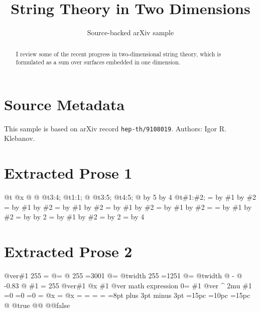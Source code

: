 \documentclass[11pt]{article}
\title{String Theory in Two Dimensions}
\author{Source-backed arXiv sample}
\date{}
\begin{document}
\maketitle
\begin{abstract}
I review some of the recent progress in two-dimensional string theory, which is formulated as a sum over surfaces embedded in one dimension.
\end{abstract}
\section{Source Metadata}
This sample is based on arXiv record \texttt{hep-th/9108019}. Authors: Igor R. Klebanov.
\section{Extracted Prose 1}
@t @x @ @ @t3:4; @t1:1; @ @t3:5; @t4:5; @ by 5 by 4 @t\#1:\#2; = by \#1 by \#2 = by \#1 by \#2 = by \#1 by \#2 = by \#1 by \#2 = by \#1 by \#2 = = by \#1 by \#2 = by by 2 = by \#1 by \#2 = by 2 = by 4
\section{Extracted Prose 2}
@ver\#1 255 = @= @ 255 =3001 @= @twidth 255 =1251 @= @twidth @ - @ -0.83 @ \#1 = 255 @ver\#1 @x \#1 @ver math expression 0= \#1 @ver \textasciicircum{} 2mu \#1 =0 =0 =0 = @x = @x = = = = =8pt plus 3pt minus 3pt =15pc =10pc =15pc @ @true @@ @@false
\end{document}
